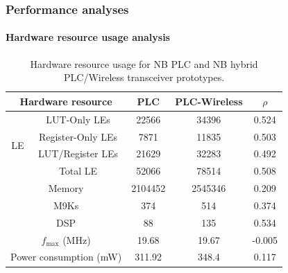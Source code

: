 \documentclass[mathserif]{beamer}
\begin{document}
\begin{frame}
	\frametitle{Performance analyses}
	\framesubtitle{Hardware resource usage analysis}
	\begin{table}[ht]
		\centering
		\caption{Hardware resource usage for NB PLC and NB hybrid PLC/Wireless transceiver prototypes.}
		\label{tab:hru}	
		\begin{tabular}{c|c|c|c|c}
			\hline
			\multicolumn{2}{c|}{Hardware resource} & PLC     & PLC-Wireless & $\rho$ \\ \hline
			\multirow{4}{*}{LE} & LUT-Only LEs      & 22566   & 34396        & 0.524        \\ \cline{2-5} 
			& Register-Only LEs & 7871    & 11835        & 0.503        \\ \cline{2-5} 
			& LUT/Register LEs  & 21629   & 32283        & 0.492        \\ \cline{2-5} 
			& Total LE          & 52066   & 78514        & 0.508        \\ \hline
			\multicolumn{2}{c|}{Memory}            & 2104452 & 2545346      & 0.209        \\ \hline
			\multicolumn{2}{c|}{M9Ks}              & 374     & 514          & 0.374        \\ \hline			
			\multicolumn{2}{c|}{DSP}         & 88      & 135          & 0.534        \\ \hline
			\multicolumn{2}{c|}{$f_{\max}$ (MHz)}              & 19.68   & 19.67        & -0.005        \\ \hline
			\multicolumn{2}{c|}{Power consumption (mW)} & 311.92  & 348.4        & 0.117        \\ \hline		
		\end{tabular}
	\end{table}
\end{frame}

\end{document}
